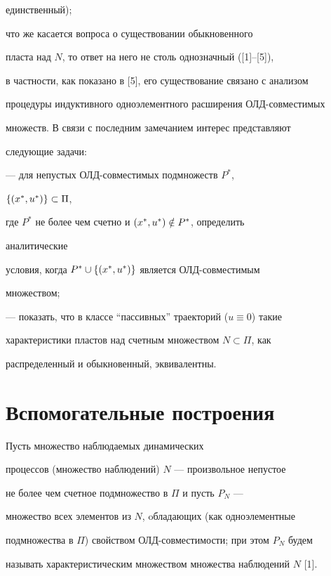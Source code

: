 единственный); 


что же касается вопроса о существовании обыкновенного 


пласта над $N$, то ответ на него не столь однозначный ([1]--[5]), 


в частности, как показано в [5], его существование связано с анализом 


процедуры индуктивного одноэлементного расширения ОЛД-совместимых 


множеств. В связи с последним замечанием интерес представляют 


следующие задачи: 


 


--- для непустых ОЛД-совместимых подмножеств $P^*$, 


$\{{(x^*_{},u^*_{})}\}\subset\Pi$, 


где $P^*$ не более чем счетно и ${(x^*_{},u^*_{})}\notin P^*$, определить 


аналитические 


условия, когда $P^*\cup\{{(x^*_{},u^*_{})}\}$ является ОЛД-совместимым 


множеством; 


 


--- показать, что в классе ``пассивных'' траекторий ($u\equiv0$) такие 


характеристики пластов над счетным множеством $N\subset\Pi$, как 


распределенный и обыкновенный, эквивалентны. 


 


\section{Вспомогательные построения} 


 


Пусть множество наблюдаемых динамических 


процессов (множество наблюдений) $N$ --- произвольное непустое 


не более чем счетное подмножество в $\Pi$ и пусть $P_N$ --- 


множество всех элементов из $N$, oбладающих (как одноэлементные 


подмножества в $\Pi$) свойством ОЛД-совместимости; при этом $P_N$ будем 


называть характеристическим множеством множества наблюдений $N$ [1]. 


